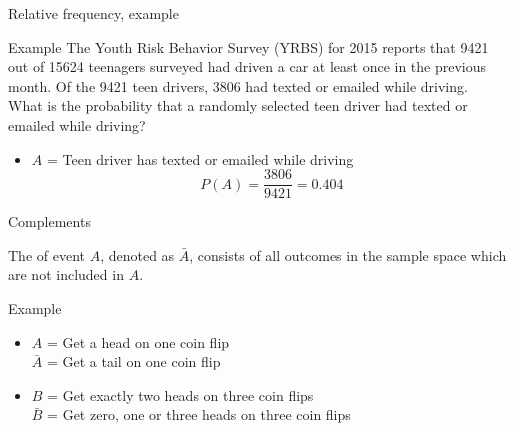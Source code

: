 \documentclass[xcolor=table, handout]{beamer}
\begin{document}
\begin{frame}{Relative frequency, example}

\begin{exampleblock}{Example}
The Youth Risk Behavior Survey (YRBS) for 2015 reports that 9421 out of 15624 teenagers surveyed had driven a car at least once in the previous month. Of the 9421 teen drivers, 3806 had texted or emailed while driving. \\
\medskip
What is the probability that a randomly selected teen driver had texted or emailed while driving? 

\pause
\begin{itemize}
\item $A$ = Teen driver has texted or emailed while driving\\
\[P(A) = \frac {3806}{9421} = 0.404\]
\end{itemize}

\end{exampleblock}

\end{frame}


\begin{frame}{Complements}
\begin{block}{}
\large The  of event $A$, denoted as $\bar A$, consists of all outcomes in the sample space which are not included in $A$.
\end{block}

\pause
\begin{exampleblock}{Example}
\begin{itemize}
\item $A$ = Get a head on one coin flip\\
\pause
$\bar A$ = Get a tail on one coin flip

\pause
\item $B$ = Get exactly two heads on three coin flips\\
\pause
$\bar B$ = Get zero, one or three heads on three coin flips
\end{itemize}
\end{exampleblock}
\end{frame}
 
\end{document}
